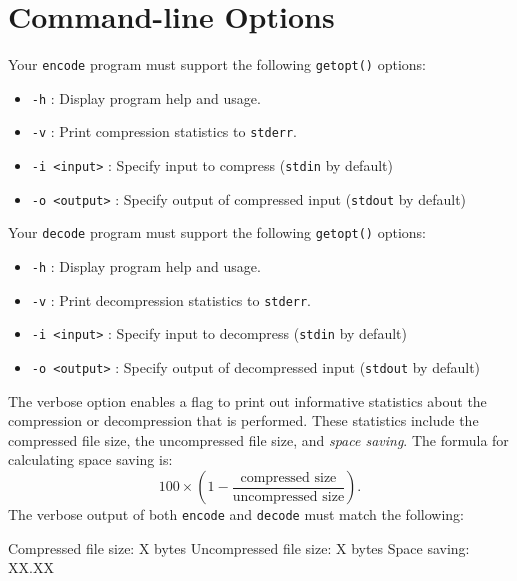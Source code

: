 \section{Command-line Options}

Your \texttt{encode} program must support the following \texttt{getopt()}
options:

\begin{itemize}
    \item \texttt{-h} : Display program help and usage.
    \item \texttt{-v} : Print compression statistics to \texttt{stderr}.
    \item \texttt{-i <input>} : Specify input to compress (\texttt{stdin} by
        default)
    \item \texttt{-o <output>} : Specify output of compressed input
        (\texttt{stdout} by default)
\end{itemize}

Your \texttt{decode} program must support the following \texttt{getopt()}
options:

\begin{itemize}
    \item \texttt{-h} : Display program help and usage.
    \item \texttt{-v} : Print decompression statistics to
      \texttt{stderr}.
    \item \texttt{-i <input>} : Specify input to decompress (\texttt{stdin} by
        default)
    \item \texttt{-o <output>} : Specify output of decompressed input
        (\texttt{stdout} by default)
\end{itemize}

The verbose option enables a flag to print out informative statistics about the
compression or decompression that is performed. These statistics include the
compressed file size, the uncompressed file size, and \emph{space saving}. The
formula for calculating space saving is:
\[
  100\times\left ( 1-\frac{\text{compressed size}} {\text{uncompressed size}} \right).
\]
The verbose output of both \texttt{encode} and \texttt{decode} must match the
following:

\begin{shlisting}{}
Compressed file size: X bytes
Uncompressed file size: X bytes
Space saving: XX.XX%
\end{shlisting}
